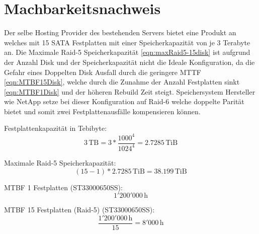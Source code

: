 \cleardoublepage
\chapter{Machbarkeitsnachweis}

Der selbe Hosting Provider des bestehenden Servers bietet eine Produkt an welches mit 15 SATA Festplatten mit einer Speicherkapazität von je 3 Terabyte an. Die Maximale Raid-5 Speicherkapazität \ref{eqn:maxRaid5-15disk} ist aufgrund der Anzahl Disk und der Speicherkapazität nicht die Ideale Konfiguration, da die Gefahr eines Doppelten Disk Ausfall durch die geringere MTTF \ref{eqn:MTBF15Disk}, welche durch die Zunahme der Anzahl Festplatten sinkt \ref{eqn:MTBF1Disk} und der höheren Rebuild Zeit steigt. Speichersystem Hersteller wie NetApp setze bei 
dieser Konfiguration auf Raid-6 welche doppelte Parität bietet und somit zwei Festplattenausfälle kompensieren können.

Festplattenkapazität in Tebibyte:
\begin{equation}
3   \, \mathrm{TB} =  3 * \frac{1000^4}{1024^4} = 2.7285  \, \mathrm{TiB}
\label{eqn:3TerrabyteTebibyte}
\end{equation}

Maximale Raid-5 Speicherkapazität:
\begin{equation}
(15 -1) * 2.7285  \, \mathrm{TiB} =  38.199 \, \mathrm{TiB}
\label{eqn:maxRaid5-15disk}
\end{equation}

MTBF 1 Festplatten (ST33000650SS): 
\begin{equation}1'200'000  \, \mathrm{h}
\label{eqn:MTBF1Disk}
\end{equation}

MTBF 15 Festplatten (Raid-5) (ST33000650SS): 
\begin{equation}
\frac{1'200'000  \, \mathrm{h}}{15}= 8'000  \, \mathrm{h}
\label{eqn:MTBF15Disk}
\end{equation}